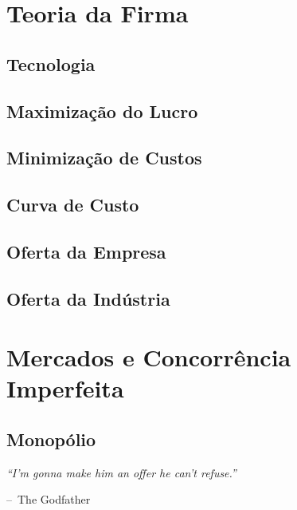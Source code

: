 \documentclass[a4paper,11pt,oneside]{book}
\makeatletter
\theoremstyle{definition}
\theoremstyle{break}
\newenvironment{chapquote}[2][2em]
  {\setlength{\@tempdima}{#1}%
   \def\chapquote@author{#2}%
   \parshape 1 \@tempdima \dimexpr\textwidth-2\@tempdima\relax%
   \itshape}
  {\par\normalfont\hfill--\ \chapquote@author\hspace*{\@tempdima}\par\bigskip}
\makeatother
\begin{document}
\part{Teoria da Firma}

\chapter{Tecnologia}

\chapter{Maximização do Lucro}

\chapter{Minimização de Custos}

\chapter{Curva de Custo}

\chapter{Oferta da Empresa}

\chapter{Oferta da Indústria}

\part{Mercados e Concorrência Imperfeita}

\chapter{Monopólio}

\begin{chapquote}{The Godfather}
	``I'm gonna make him an offer he can't refuse.''
\end{chapquote}
\end{document}

